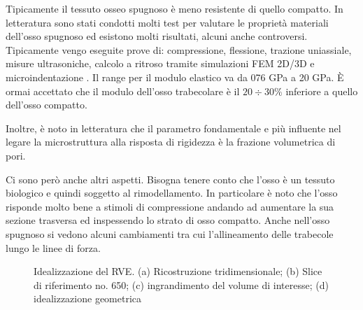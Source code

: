 \documentclass[a4paper,num-refs]{oup-contemporary}
\begin{document}
Tipicamente il tessuto osseo spugnoso è meno resistente di quello compatto.  In letteratura sono stati condotti molti test per valutare le proprietà materiali dell'osso spugnoso ed esistono molti risultati, alcuni anche controversi. Tipicamente vengo eseguite prove di: compressione, flessione, trazione uniassiale, misure ultrasoniche, calcolo a ritroso tramite simulazioni FEM 2D/3D e microindentazione \citep{Cowin1}. Il range per il modulo elastico va da 076 GPa a 20 GPa. È ormai accettato che il modulo dell'osso trabecolare è il $20\div30\%$ inferiore a quello dell'osso compatto. 

Inoltre, è noto in letteratura che il parametro fondamentale e più influente nel legare la microstruttura alla risposta di rigidezza è la frazione volumetrica di pori.\citep{Nazarian}

Ci sono però anche altri aspetti. Bisogna tenere conto che l'osso è un tessuto biologico e quindi soggetto al rimodellamento. In particolare è noto che l'osso risponde molto bene a stimoli di compressione andando ad aumentare la sua sezione trasversa ed inspessendo lo strato di osso compatto. Anche nell'osso spugnoso si vedono alcuni cambiamenti tra cui l'allineamento delle trabecole lungo le linee di forza.  \citep{Ferguson:2003}


\begin{figure}%
	\centering
	\def\svgwidth{\textwidth}

	\caption{Idealizzazione del RVE. (a) Ricostruzione tridimensionale; (b) Slice di riferimento no. 650; (c) ingrandimento del volume di interesse; (d) idealizzazione geometrica} 
\label{fig:homogen_RVE}
\end{figure}
\end{document}
